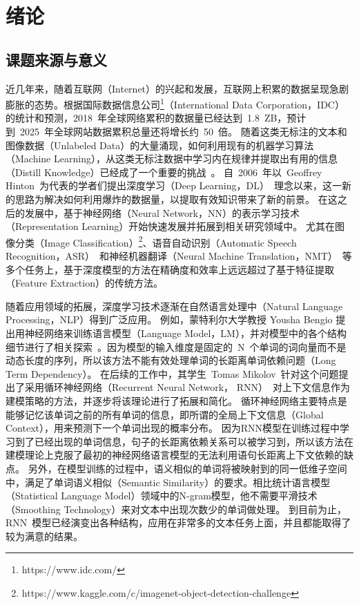 \chapter{绪论}
\section{课题来源与意义}
近几年来，随着互联网（Internet）的兴起和发展，互联网上积累的数据呈现急剧膨胀的态势。根据国际数据信息公司\footnote{https://www.idc.com/}（International Data Corporation，IDC）的统计和预测，2018~年全球网络累积的数据量已经达到~1.8~ZB，预计到~2025~年全球网站数据累积总量还将增长约~50~倍。
随着这类无标注的文本和图像数据（Unlabeled Data）的大量涌现，如何利用现有的机器学习算法（Machine Learning），从这类无标注数据中学习内在规律并提取出有用的信息（Distill Knowledge）已经成了一个重要的挑战~。
自~2006~年以~Geoffrey Hinton~为代表的学者们提出深度学习（Deep Learning，DL）~理念以来，这一新的思路为解决如何利用爆炸的数据量，以提取有效知识带来了新的前景。
在这之后的发展中，基于神经网络（Neural Network，NN）的表示学习技术（Representation Learning）开始快速发展并拓展到相关研究领域中。
尤其在图像分类（Image Classification）\footnote{https://www.kaggle.com/c/imagenet-object-detection-challenge}、语音自动识别（Automatic Speech Recognition，ASR）~和神经机器翻译（Neural Machine Translation，NMT）~等多个任务上，基于深度模型的方法在精确度和效率上远远超过了基于特征提取（Feature Extraction）的传统方法。

随着应用领域的拓展，深度学习技术逐渐在自然语言处理中（Natural Language Processing，NLP）得到广泛应用。 例如，蒙特利尔大学教授 Yousha Bengio 提出用神经网络来训练语言模型（Language Model，LM），并对模型中的各个结构细节进行了相关探索~。因为模型的输入维度是固定的~N~个单词的词向量而不是动态长度的序列，所以该方法不能有效处理单词的长距离单词依赖问题（Long Term Dependency）。
在后续的工作中，其学生~Tomas Mikolov~针对这个问题提出了采用循环神经网络（Recurrent Neural Network， RNN）~对上下文信息作为建模策略的方法，并逐步将该理论进行了拓展和简化。
循环神经网络主要特点是能够记忆该单词之前的所有单词的信息，即所谓的全局上下文信息（Global Context），用来预测下一个单词出现的概率分布。
因为RNN模型在训练过程中学习到了已经出现的单词信息，句子的长距离依赖关系可以被学习到，所以该方法在建模理论上克服了最初的神经网络语言模型的无法利用语句长距离上下文依赖的缺点。
另外，在模型训练的过程中，语义相似的单词将被映射到的同一低维子空间中，满足了单词语义相似（Semantic Similarity）的要求。相比统计语言模型（Statistical Language Model）领域中的N-gram模型，他不需要平滑技术（Smoothing Technology）来对文本中出现次数少的单词做处理。
到目前为止，RNN~模型已经演变出各种结构，应用在非常多的文本任务上面，并且都能取得了较为满意的结果。

